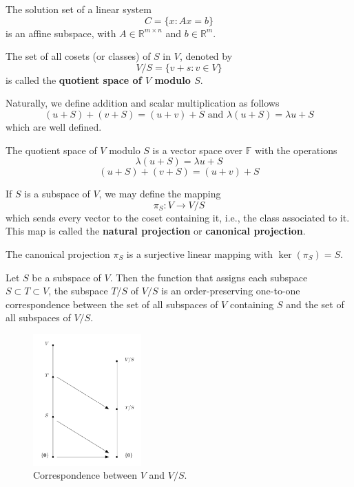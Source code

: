 \begin{example}
	The solution set of a linear system 
	\[
		C = \{ x : Ax = b \}
	\]
	is an affine subspace, with $A \in \mathbb{R}^{m \times n}$ and $b \in \mathbb{R}^m$.
\end{example}

\begin{definition}
	The set of all cosets (or classes) of $S$ in $V$, denoted by
\[
	V / S = \{ v+s : v \in V \}
\]
is called the \textbf{quotient space of $V$ modulo $S$}.
\end{definition}

Naturally, we define addition and scalar multiplication as follows
\[
	(u + S) + (v + S) = (u + v) + S \text{ and } \lambda(u+S) = \lambda u + S
\]
which are well defined.

\begin{theorem}
	The quotient space of $V$ modulo $S$ is a vector space over $\mathbb{F}$ with the operations
	\[
		\lambda(u + S) = \lambda u + S
	\]
	\[
		(u + S) + (v + S) = (u + v) + S
	\]
\end{theorem}

\begin{definition}
	If $S$ is a subspace of $V$, we may define the mapping 
	\[
		\pi_S : V \longrightarrow V/S
	\]
	which sends every vector to the coset containing it, i.e., the class associated to it. This map is called the \textbf{natural projection} or \textbf{canonical projection}.
\end{definition}

\begin{theorem}
	The canonical projection $\pi_S$ is a surjective linear mapping with $\ker (\pi_S) = S$.
\end{theorem}

\begin{theorem}
	Let $S$ be a subspace of $V$. Then the function that assigns each subspace $S \subset T \subset V$, the subspace $T/S$ of $V/S$ is an order-preserving one-to-one correspondence between the set of all subspaces of $V$ containing $S$ and the set of all subspaces of $V/S$.
\end{theorem}

\begin{figure}[h]
	\centering
	  \includegraphics[width=0.37\textwidth]{Figures/correspondence_theorem.png} 
	  \caption{Correspondence between $V$ and $V/S$.}
	  \label{fig:correspondence-theorem}
\end{figure}

